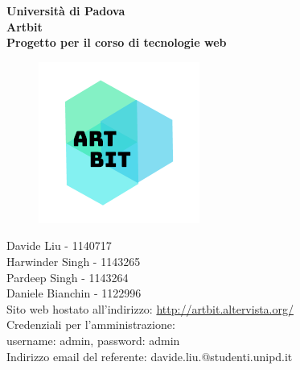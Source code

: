 \documentclass[openany, a4paper, 12pt]{report}
\begin{document}
	\begin{titlepage}
		\centering
		\vfill
		{
			\bfseries
			\vskip2cm
			\Large Università di Padova\\
			\vfill
			\Huge Artbit\\
			\Large Progetto per il corso di tecnologie web\\
			\vfill
			
			\begin{figure}[H]
				\centering
				\includegraphics[width=0.6\linewidth]{logo.png}
			\end{figure}
			\large Davide Liu - 1140717 \\ Harwinder Singh - 1143265 \\ Pardeep Singh - 1143264 \\ Daniele Bianchin - 1122996 \\
			\vfill
			Sito web hostato all'indirizzo: \url{http://artbit.altervista.org/}\\
			{\small Credenziali per l'amministrazione:\\username: admin, password: admin\\}
			\vfill
			Indirizzo email del referente: davide.liu.@studenti.unipd.it\\
			\vfill
		}
	\end{titlepage}

	\newpage

\end{document}
